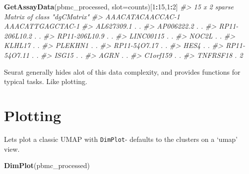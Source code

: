\documentclass[
]{book}
\newenvironment{Shaded}{\begin{snugshade}}{\end{snugshade}}
\newcommand{\AttributeTok}[1]{\textcolor[rgb]{0.13,0.29,0.53}{#1}}
\newcommand{\CommentTok}[1]{\textcolor[rgb]{0.56,0.35,0.01}{\textit{#1}}}
\newcommand{\DecValTok}[1]{\textcolor[rgb]{0.00,0.00,0.81}{#1}}
\newcommand{\FunctionTok}[1]{\textcolor[rgb]{0.13,0.29,0.53}{\textbf{#1}}}
\newcommand{\NormalTok}[1]{#1}
\newcommand{\SpecialCharTok}[1]{\textcolor[rgb]{0.81,0.36,0.00}{\textbf{#1}}}
\newcommand{\StringTok}[1]{\textcolor[rgb]{0.31,0.60,0.02}{#1}}
\begin{document}
\begin{Shaded}
\begin{Highlighting}[]
\FunctionTok{GetAssayData}\NormalTok{(pbmc\_processed, }\AttributeTok{slot=}\StringTok{\textquotesingle{}counts\textquotesingle{}}\NormalTok{)[}\DecValTok{1}\SpecialCharTok{:}\DecValTok{15}\NormalTok{,}\DecValTok{1}\SpecialCharTok{:}\DecValTok{2}\NormalTok{]}
\CommentTok{\#\textgreater{} 15 x 2 sparse Matrix of class "dgCMatrix"}
\CommentTok{\#\textgreater{}               AAACATACAACCAC{-}1 AAACATTGAGCTAC{-}1}
\CommentTok{\#\textgreater{} AL627309.1                   .                .}
\CommentTok{\#\textgreater{} AP006222.2                   .                .}
\CommentTok{\#\textgreater{} RP11{-}206L10.2                .                .}
\CommentTok{\#\textgreater{} RP11{-}206L10.9                .                .}
\CommentTok{\#\textgreater{} LINC00115                    .                .}
\CommentTok{\#\textgreater{} NOC2L                        .                .}
\CommentTok{\#\textgreater{} KLHL17                       .                .}
\CommentTok{\#\textgreater{} PLEKHN1                      .                .}
\CommentTok{\#\textgreater{} RP11{-}54O7.17                 .                .}
\CommentTok{\#\textgreater{} HES4                         .                .}
\CommentTok{\#\textgreater{} RP11{-}54O7.11                 .                .}
\CommentTok{\#\textgreater{} ISG15                        .                .}
\CommentTok{\#\textgreater{} AGRN                         .                .}
\CommentTok{\#\textgreater{} C1orf159                     .                .}
\CommentTok{\#\textgreater{} TNFRSF18                     .                2}
\end{Highlighting}
\end{Shaded}

Seurat generally hides alot of this data complexity, and provides functions for typical tasks. Like plotting.

\hypertarget{plotting}{%
\section{Plotting}\label{plotting}}

Lets plot a classic UMAP with \texttt{DimPlot}- defaults to the clusters on a `umap' view.

\begin{Shaded}
\begin{Highlighting}[]
\FunctionTok{DimPlot}\NormalTok{(pbmc\_processed)}
\end{Highlighting}
\end{Shaded}
\end{document}
